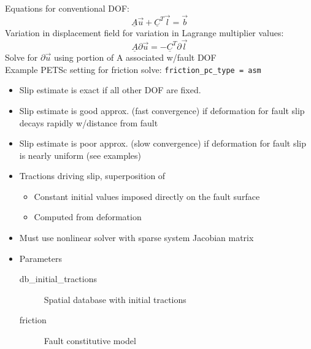 \documentclass[pdftex,cig,slideColor]{pp4slides}
\begin{document}
  \vfill
  Equations for conventional DOF:
  \vspace*{-14pt}
  \begin{equation}
    \underline{A} \vec{u} + \underline{C}^T \vec{l} = \vec{b}
  \end{equation}
  Variation in displacement field for variation in Lagrange multiplier
  values:
  \vspace*{-14pt}
  \begin{equation}
    \underline{A} \partial\vec{u} = -\underline{C}^T \partial\vec{l}
  \end{equation}
  Solve for $\partial \vec{u}$ using portion of A associated
  w/fault DOF \\
  Example PETSc setting for friction solve: {\tt friction\_pc\_type = asm}
  \begin{itemize}
  \item Slip estimate is exact if all other DOF are fixed.
  \item Slip estimate is good approx. (fast convergence) if
    deformation for fault slip decays rapidly w/distance from fault
  \item Slip estimate is poor approx. (slow convergence) if
    deformation for fault slip is nearly uniform (see examples)
  \end{itemize}
  
 
  \summary{}

  \begin{itemize}
  \item Tractions driving slip, superposition of
    \begin{itemize}
    \item Constant initial values imposed directly on the fault surface
    \item Computed from deformation
    \end{itemize}
  \item Must use nonlinear solver with sparse system Jacobian matrix
  \item Parameters
    \begin{description}
    \item[db\_initial\_tractions] Spatial database with initial tractions
    \item[friction] Fault constitutive model
    \end{description}
  \end{itemize}
  
\end{document}
